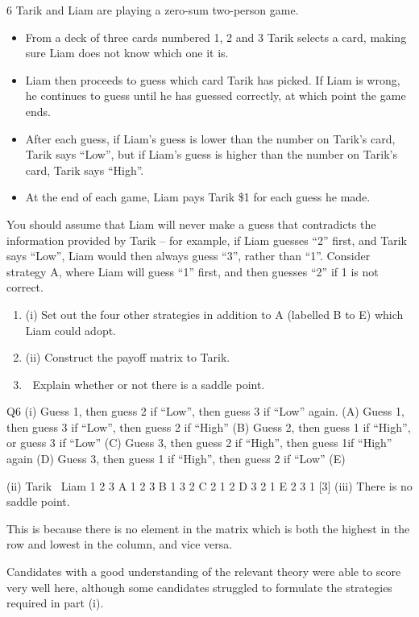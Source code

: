 \documentclass[a4paper,12pt]{article}
\begin{document}
6
Tarik and Liam are playing a zero-sum two-person game. 
\begin{itemize}
    \item From a deck of three cards numbered 1, 2 and 3 Tarik selects a card, making sure Liam does not know which one it is.
      \item Liam then proceeds to guess which card Tarik has picked. If Liam is wrong, he
continues to guess until he has guessed correctly, at which point the game ends.
  \item After each guess, if Liam’s guess is lower than the number on Tarik’s card, Tarik 
says “Low”, but if Liam’s guess is higher than the number on Tarik’s card, Tarik says
“High”.
  \item At the end of each game, Liam pays Tarik \$1 for each guess he made.
\end{itemize}
You should assume that Liam will never make a guess that contradicts the information
provided by Tarik – for example, if Liam guesses “2” first, and Tarik says “Low”,
Liam would then always guess “3”, rather than “1”.
Consider strategy A, where Liam will guess “1” first, and then guesses “2” if 1 is not
correct.

\begin{enumerate}
\item (i) Set out the four other strategies in addition to A (labelled B to E) which Liam
could adopt.
\item 
(ii) Construct the payoff matrix to Tarik.
\item 
 Explain whether or not there is a saddle point.
\end{enumerate}


Q6
(i)
Guess 1, then guess 2 if “Low”, then guess 3 if “Low” again. (A)
Guess 1, then guess 3 if “Low”, then guess 2 if “High” (B)
Guess 2, then guess 1 if “High”, or guess 3 if “Low” (C)
Guess 3, then guess 2 if “High”, then guess 1if “High” again (D)
Guess 3, then guess 1 if “High”, then guess 2 if “Low” (E)

(ii)
Tarik \ Liam
1
2
3
A
1
2
3
B
1
3
2
C
2
1
2
D
3
2
1
E
2
3
1
[3]
(iii)
There is no saddle point.

This is because there is no element in the matrix which is both the highest in
the row and lowest in the column, and vice versa.

Candidates with a good understanding of the relevant theory were able
to score very well here, although some candidates struggled to
formulate the strategies required in part (i).
\end{document}
